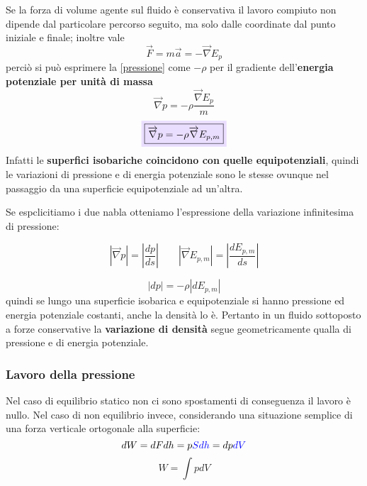 \documentclass[x11names]{article}
\newcommand{\viola}[1]{\colorbox{yred}{$\displaystyle #1$}}
\begin{document}
		\noindent
		Se la forza di volume agente sul fluido è conservativa il lavoro compiuto non dipende dal particolare percorso seguito, ma solo dalle coordinate dal punto iniziale e finale; inoltre vale
		\[ 
		\overrightarrow{F} = m \vec{a} = -\overrightarrow{\nabla}E_p
		\]
		perciò si può esprimere la \ref{pressione} come \(-\rho\) per il gradiente dell'\textbf{energia potenziale per unità di massa}
		\[
			\overrightarrow{\nabla} p = -\rho \frac{\overrightarrow{\nabla}E_p}{m}
		\]
		\begin{equation}\label{gradiente pressione}
			\viola{\boxed{\overrightarrow{\nabla} p = -\rho \overrightarrow{\nabla}E_{p,m}}}
		\end{equation}
		Infatti le \textbf{superfici isobariche coincidono con quelle equipotenziali}, quindi le variazioni di pressione e di energia potenziale sono le stesse ovunque nel passaggio da una superficie equipotenziale ad un'altra. 
		
		Se espclicitiamo i due nabla otteniamo l'espressione della variazione infinitesima di pressione:
		
		\[ 
		\boxed{\left|\overrightarrow{\nabla}p \right|= \left|\frac{dp}{ds}\right|} \qquad \boxed{\left|\overrightarrow{\nabla}E_{p,m} \right|= \left|\frac{dE_{p,m}}{ds}\right|}
		\]
		
		\[ 
		|dp |= -\rho |dE_{p,m}|
		\]
		quindi se lungo una superficie isobarica e equipotenziale si hanno pressione ed energia potenziale costanti, anche la densità lo è. Pertanto in un fluido sottoposto a forze conservative la \textbf{variazione di densità} segue geometricamente qualla di pressione e di energia potenziale.
		
	\subsubsection{Lavoro della pressione}
	Nel caso di equilibrio statico non ci sono spostamenti di conseguenza il lavoro è nullo. Nel caso di non equilibrio invece, considerando una situazione semplice di una forza verticale ortogonale alla superficie:
	\[ 
	dW = dF dh = p\textcolor{blue}{S dh }= dp \textcolor{blue}{dV }
	\] 
	\begin{equation}
		W = \int{pdV}
	\end{equation}
	
\end{document}
